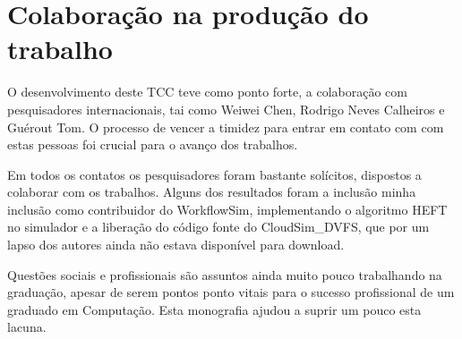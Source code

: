\section{Colaboração na produção do trabalho} %
\label{sec:colaboracao_na_producao_do_trabalho}

O desenvolvimento deste TCC teve como ponto forte, a colaboração com
pesquisadores internacionais, tai como Weiwei Chen, Rodrigo Neves Calheiros e
Guérout Tom. O processo de vencer a timidez para entrar em contato com com estas
pessoas foi crucial para o avanço dos trabalhos.

Em todos os contatos os pesquisadores foram bastante solícitos, dispostos a
colaborar com os trabalhos. Alguns dos resultados foram a inclusão minha
inclusão como contribuidor do WorkflowSim, implementando o algoritmo HEFT no
simulador e a liberação do código fonte do CloudSim\_DVFS, que por um lapso dos
autores ainda não estava disponível para download.

Questões sociais e profissionais são assuntos ainda muito pouco trabalhando na
graduação, apesar de serem pontos ponto vitais para o sucesso profissional de um
graduado em Computação. Esta monografia ajudou a suprir um pouco esta lacuna.


